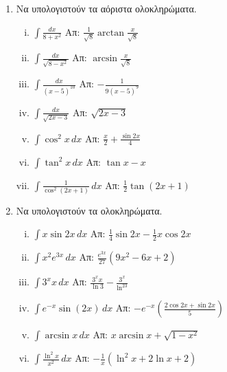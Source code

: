 



\pagestyle{askhseis}
\everymath{\displaystyle}





\begin{center}
  \minibox{{\large\bfseries \textcolor{Col1}{Ασκήσεις στα Αόριστα Ολοκληρώματα}}}
\end{center}

\vspace{\baselineskip}


\begin{enumerate}
  \item Να υπολογιστούν τα αόριστα ολοκληρώματα.
    \begin{enumerate}[i)]
      \item $\int\frac{dx}{8+x^2} $ 
        \hfill Απ: $\frac{1}{\sqrt{8}} \arctan \frac{x}{\sqrt{8}}$
      \item $\int\frac{dx}{\sqrt{8-x^{2}}} $ \hfill Απ: $\arcsin \frac{x}{\sqrt{8}}$
      \item $\int\frac{dx}{(x-5)^{10}} $ \hfill Απ: $-\frac{1}{9(x-5)^9}$
      \item $ \int\frac{dx}{\sqrt{2x-3}}$ \hfill Απ: $ \sqrt{2x-3} $
      \item $\int\cos^2x \, dx$ \hfill Απ: $\frac{x}{2} + \frac{\sin2x}{4}$
      \item $\int\tan^2x \, dx$ \hfill Απ: $ \tan{x} - x$
      \item $ \int \frac{1}{\cos^{2}{(2x+1)}} \,{dx} $ 
        \hfill Απ: $ \frac{1}{2} \tan{(2x+1)} $ 
    \end{enumerate}

  \item Να υπολογιστούν τα ολοκληρώματα.
    \begin{enumerate}[i)]
      \item $\int x\sin2x \, dx$ \hfill Απ: $\frac{1}{4}\sin2x-\frac{1}{2}x\cos2x$
      \item $\int x^2e^{3x} \, dx$ \hfill Απ: $\frac{e^{3x}}{27}(9x^2-6x+2)$
      \item $\int 3^{x}x \, dx$ \hfill Απ: $\frac{3^xx}{\ln3}-\frac{3^x}{\ln^23}$
      \item $\int e^{-x}\sin(2x) \, dx$ 
         \hfill Απ: $-e^{-x}\left(\frac{2\cos2x+\sin2x}{5}\right)$
      \item $\int \arcsin x \, dx$ \hfill Απ: $x\arcsin x + \sqrt{1-x^2}$
      \item $\int \frac{\ln^2x}{x^2} \, dx$ \hfill Απ: $-\frac{1}{x}(\ln^2x+2\ln x+2)$
    \end{enumerate}


\end{enumerate}
